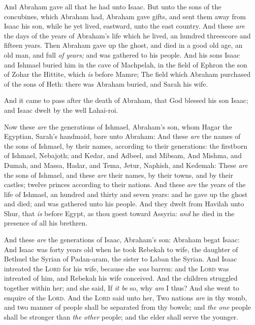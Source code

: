 \documentclass[11pt,letterpaper,oneside]{memoir}
\begin{document}
And Abraham gave all that he had unto Isaac. But unto the sons of the
concubines, which Abraham had, Abraham gave gifts, and sent them away
from Isaac his son, while he yet lived, eastward, unto the east country.
And these \emph{are} the days of the years of Abraham's life which he
lived, an hundred threescore and fifteen years. Then Abraham gave up the
ghost, and died in a good old age, an old man, and full \emph{of years;}
and was gathered to his people. And his sons Isaac and Ishmael buried
him in the cave of Machpelah, in the field of Ephron the son of Zohar
the Hittite, which \emph{is} before Mamre; The field which Abraham
purchased of the sons of Heth: there was Abraham buried, and Sarah his
wife.

And it came to pass after the death of Abraham, that God blessed his son
Isaac; and Isaac dwelt by the well Lahai-roi.

Now these \emph{are} the generations of Ishmael, Abraham's son, whom
Hagar the Egyptian, Sarah's handmaid, bare unto Abraham: And these
\emph{are} the names of the sons of Ishmael, by their names, according
to their generations: the firstborn of Ishmael, Nebajoth; and Kedar, and
Adbeel, and Mibsam, And Mishma, and Dumah, and Massa, Hadar, and Tema,
Jetur, Naphish, and Kedemah: These \emph{are} the sons of Ishmael, and
these \emph{are} their names, by their towns, and by their castles;
twelve princes according to their nations. And these \emph{are} the
years of the life of Ishmael, an hundred and thirty and seven years: and
he gave up the ghost and died; and was gathered unto his people. And
they dwelt from Havilah unto Shur, that \emph{is} before Egypt, as thou
goest toward Assyria: \emph{and} he died in the presence of all his
brethren.

And these \emph{are} the generations of Isaac, Abraham's son: Abraham
begat Isaac: And Isaac was forty years old when he took Rebekah to wife,
the daughter of Bethuel the Syrian of Padan-aram, the sister to Laban
the Syrian. And Isaac intreated the \textsc{Lord} for his wife, because
she \emph{was} barren: and the \textsc{Lord} was intreated of him, and
Rebekah his wife conceived. And the children struggled together within
her; and she said, If \emph{it be} so, why \emph{am} I thus? And she
went to enquire of the \textsc{Lord}. And the \textsc{Lord} said unto her,
Two nations \emph{are} in thy womb, and two manner of people shall be
separated from thy bowels; and \emph{the one} people shall be stronger
than \emph{the other} people; and the elder shall serve the younger.
\end{document}
